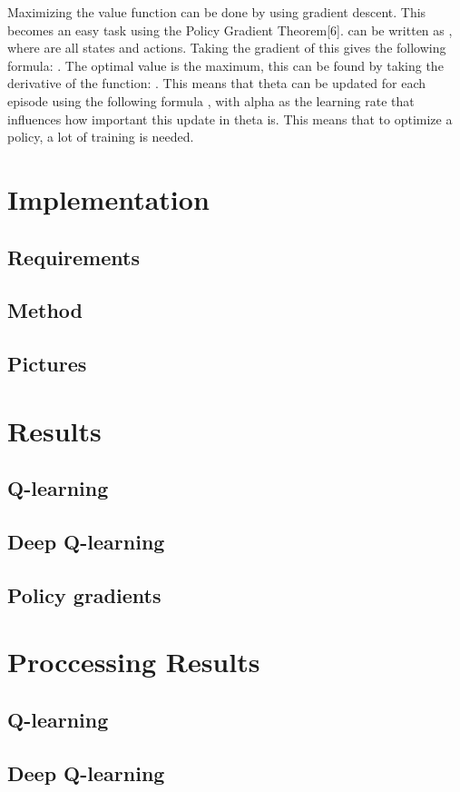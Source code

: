 \documentclass{article}
\begin{document}
Maximizing the value function can be done by using gradient descent. This becomes an easy task using the Policy Gradient Theorem[6].  can be written as , where  are all states and actions. Taking the gradient of this gives the following formula: . The optimal value is the maximum, this can be found by taking the derivative of the function: . This means that theta can be updated for each episode using the following formula , with alpha as the learning rate that influences how important this update in theta is. This means that to optimize a policy, a lot of training is needed.


\section{Implementation}
\subsection{Requirements}
\subsection{Method}
\subsection{Pictures}

\section{Results}
\subsection{Q-learning}
\subsection{Deep Q-learning}
\subsection{Policy gradients}

\section{Proccessing Results}
\subsection{Q-learning}
\subsection{Deep Q-learning}
\end{document}
